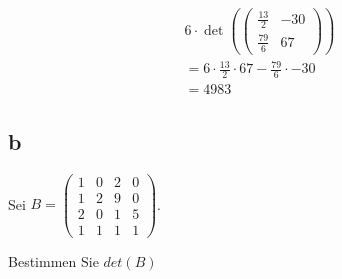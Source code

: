 \begin{align*}
    6 \cdot \det\left(\begin{pmatrix}
        \frac{13}{2} & -30 \\ \frac{79}{6} & 67
    \end{pmatrix}\right) \\
    = 6 \cdot \frac{13}{2} \cdot 67 - \frac{79}{6} \cdot -30 \\
    = 4983
\end{align*}

\subsection{b}

Sei $B = \begin{pmatrix}
    1 & 0 & 2 & 0 \\ 1 & 2 & 9 & 0 \\ 2 & 0 & 1 & 5 \\ 1 & 1 & 1 & 1
\end{pmatrix}$.

Bestimmen Sie $det(B)$


